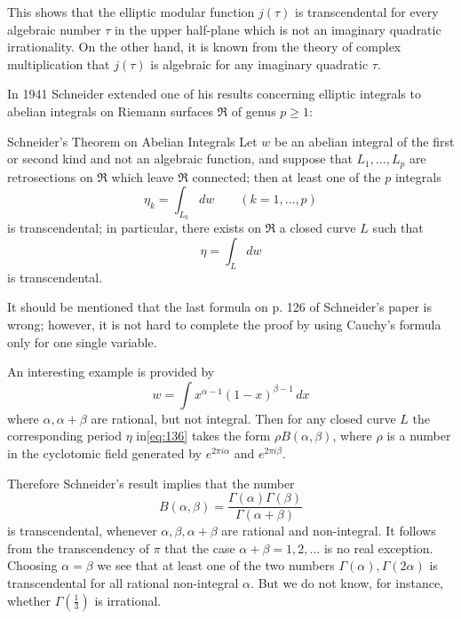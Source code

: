 This shows that the elliptic modular function $j(\tau)$ is transcendental for every algebraic number $\tau$ in the upper half-plane which is not an imaginary quadratic irrationality. On the other hand, it is known from the theory of complex multiplication that $j(\tau)$ is algebraic for any imaginary quadratic $\tau$.

In 1941 Schneider extended one of his results concerning elliptic integrals to abelian integrals on Riemann surfaces $\mathfrak{R}$ of genus $p \ge 1$:

\begin{mythm*}{Schneider's Theorem on Abelian Integrals}
Let $w$ be an abelian integral of the first or second kind and not an algebraic function, and suppose that $L_1, \dots, L_p$ are retrosections on $\mathfrak{R}$ which leave $\mathfrak{R}$ connected; then at least one of the $p$ integrals
\[
\eta_{k} = \int_{L_{k}} dw \qquad (k=1,\dots,p)
\]
is transcendental; in particular, there exists on $\mathfrak{R}$ a closed curve $L$ such that
\begin{equation}
\eta = \int_{L} dw \tag{136}\label{eq:136}
\end{equation}
is transcendental.
\end{mythm*}

It should be mentioned that the last formula on p. 126 of Schneider's paper is wrong; however, it is not hard to complete the proof by using Cauchy's formula only for one single variable.

An interesting example is provided by
\[
w = \int x^{\alpha-1} (1-x)^{\beta-1} \, dx
\]
where $\alpha, \alpha+\beta$ are rational, but not integral. Then for any closed curve $L$ the corresponding period $\eta$ in\eqref{eq:136} takes the form $\rho B(\alpha, \beta)$, where $\rho$ is a number in the cyclotomic field generated by $e^{2\pi i \alpha}$ and $e^{2\pi i \beta}$.

Therefore Schneider's result implies that the number
\[
B(\alpha, \beta) = \frac{\Gamma(\alpha)\Gamma(\beta)}{\Gamma(\alpha+\beta)}
\]
is transcendental, whenever $\alpha, \beta, \alpha+\beta$ are rational and non-integral. It follows from the transcendency of $\pi$ that the case $\alpha+\beta = 1, 2, \dots$ is no real exception. Choosing $\alpha = \beta$ we see that at least one of the two numbers $\Gamma(\alpha), \Gamma(2\alpha)$ is transcendental for all rational non-integral $\alpha$. But we do not know, for instance, whether $\Gamma(\frac{1}{3})$ is irrational.

